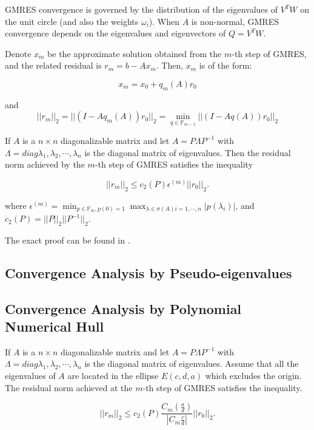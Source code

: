GMRES convergence is governed by the distribution of the eigenvalues of $V^TW$ on the unit circle (and also the weights $\omega_i$).  When $A$ is non-normal, GMRES convergence depends on the eigenvalues and eigenvectors of $Q=V^TW$.

\begin{theorem}
	Denote $x_m$ be the approximate solution obtained from the $m$-th step of GMRES, and the related residual is $r_m=b-Ax_m$. Then, $x_m$ is of the form:
	
	\begin{equation}
		x_m = x_0 + q_m(A)r_0
	\end{equation}
	
	and 
	\begin{equation}
		||r_m||_2=||(I-Aq_m(A))r_0||_2=\min_{q \in \mathbb{P}_{m-1}}||(I-Aq(A))r_0||_2
	\end{equation}
\end{theorem}

\begin{theorem}
	If $A$ is a $n \times n$ diagonalizable matrix and let $A=P\Lambda P^{-1}$ with $\Lambda=diag{\lambda_1, \lambda_2, \cdots, \lambda_n}$ is the diagonal matrix of eigenvalues. Then the residual norm achieved by the $m$-th step of GMRES satisfies the inequality
	
	\begin{equation}
		||r_m||_2 \leq c_2(P)\epsilon^{(m)}||r_0||_2.
	\end{equation}
\end{theorem}

where $\epsilon^{(m)}=\min_{p \in \mathbb{P}_m, p(0)=1} \max_{\lambda \in \sigma(A)i=1,\cdots,n}|p(\lambda_i)|$, and $c_2(P)=||P||_2||P^{-1}||_2$.

The exact proof can be found in \cite{saad2003iterative}.

\subsection{Convergence Analysis by Pseudo-eigenvalues}

\subsection{Convergence Analysis by Polynomial Numerical Hull}


\begin{corollary}
	If $A$ is a $n \times n$ diagonalizable matrix and let $A=P\Lambda P^{-1}$ with $\Lambda=diag{\lambda_1, \lambda_2, \cdots, \lambda_n}$ is the diagonal matrix of eigenvalues. Assume that all the eigenvalues of $A$ are located in the ellipse $E(c,d,a)$ which excludes the origin. The residual norm achieved at the $m$-th step of GMRES satisfies the inequality.
	
	\begin{equation}
	||r_m||_2 \leq c_2(P)\frac{C_m(\frac{a}{d})}{|C_m\frac{c}{d}|}||r_0||_2.
	\end{equation}
\end{corollary}

